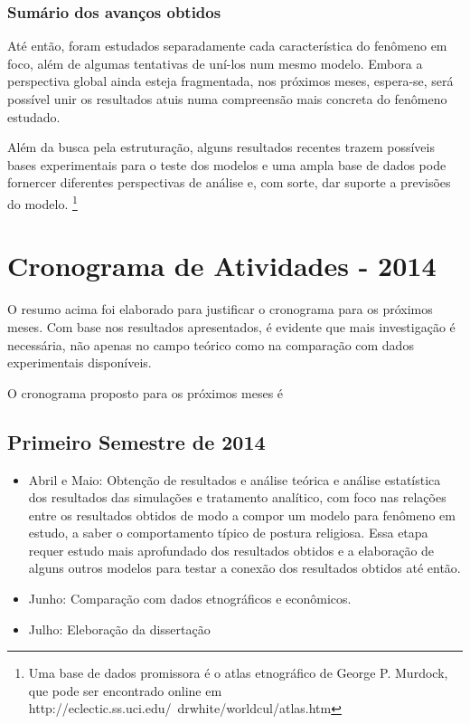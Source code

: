 \documentclass[11pt]{article}
\begin{document}
\subsubsection{Sumário dos avanços obtidos}

Até então, foram estudados separadamente cada característica do fenômeno em foco,
além de algumas tentativas de uní-los num mesmo modelo. Embora a perspectiva
global ainda esteja fragmentada, nos próximos meses, espera-se, será possível
unir os resultados atuis numa compreensão mais concreta do fenômeno estudado.

Além da busca pela estruturação, alguns resultados recentes trazem possíveis
bases experimentais para o teste dos modelos \cite{Toorn} e
uma ampla base de dados pode fornercer diferentes perspectivas de
análise e, com sorte, dar suporte a previsões do modelo. \footnote{Uma base de
dados promissora é o atlas etnográfico de George P. Murdock, que pode ser
encontrado online em http://eclectic.ss.uci.edu/~drwhite/worldcul/atlas.htm}



\section{Cronograma de Atividades - 2014}

O resumo acima foi elaborado para justificar o cronograma para os próximos
meses. Com base nos resultados apresentados, é evidente que mais investigação é
necessária, não apenas no campo teórico como na comparação com dados
experimentais disponíveis. 

O cronograma proposto para os próximos meses é

\subsection{Primeiro Semestre de 2014}
\begin{itemize}
\item Abril e Maio: Obtenção de resultados e análise teórica e análise 
    estatística dos resultados das simulações e 
    tratamento analítico, com foco nas relações
    entre os resultados obtidos de modo a compor um modelo para fenômeno em
    estudo, a saber o comportamento típico de postura religiosa. Essa etapa
    requer estudo mais aprofundado dos resultados obtidos e a elaboração de
    alguns outros modelos para testar a conexão dos resultados obtidos até
    então.
    

\item Junho: Comparação com dados etnográficos e econômicos.

\item Julho: Eleboração da dissertação
\end{itemize}
\end{document}
